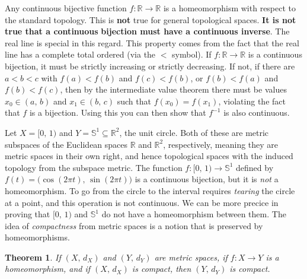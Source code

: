 \documentclass{article}
\theoremstyle{plain}
\newtheorem{theorem}{Theorem}[section]
\theoremstyle{normal}
\newenvironment{example}{%
    \pushQED{\qed}\renewcommand{\qedsymbol}{$\blacksquare$}\examplex%
}{%
    \popQED\endexamplex%
}
\begin{document}
        \begin{example}
            Any continuous bijective function
            $f:\mathbb{R}\rightarrow\mathbb{R}$ is a homeomorphism with respect
            to the standard topology. This is \textbf{not} true for general
            topological spaces. \textbf{It is not true that a continuous}
            \textbf{bijection must have a continuous inverse}. The real line is
            special in this regard. This property comes from the fact that the
            real line has a complete total ordered (via the $<$ symbol). If
            $f:\mathbb{R}\rightarrow\mathbb{R}$ is a continuous bijection, it
            must be strictly increasing or strictly decreasing. If not, if
            there are $a<b<c$ with $f(a)<f(b)$ and $f(c)<f(b)$, or
            $f(b)<f(a)$ and $f(b)<f(c)$, then by the intermediate value theorem
            there must be values $x_{0}\in(a,\,b)$ and $x_{1}\in(b,\,c)$ such
            that $f(x_{0})=f(x_{1})$, violating the fact that $f$ is a
            bijection. Using this you can then show that $f^{-1}$ is also
            continuous.
        \end{example}
        \begin{example}
            Let $X=[0,\,1)$ and $Y=\mathbb{S}^{1}\subseteq\mathbb{R}^{2}$, the
            unit circle. Both of these are metric subspaces of the Euclidean
            spaces $\mathbb{R}$ and $\mathbb{R}^{2}$, respectively, meaning they
            are metric spaces in their own right, and hence topological spaces
            with the induced topology from the subspace metric. The function
            $f:[0,\,1)\rightarrow\mathbb{S}^{1}$ defined by
            $f(t)=\big(\cos(2\pi{t}),\,\sin(2\pi{t})\big)$ is a continuous
            bijection, but it is \textit{not} a homeomorphism. To go from the
            circle to the interval requires \textit{tearing} the circle at a
            point, and this operation is not continuous.
        \end{example}
        We can be more precice in proving that $[0,\,1)$ and $\mathbb{S}^{1}$
        do not have a homeomorphism between them. The idea of
        \textit{compactness} from metric spaces is a notion that is preserved
        by homeomorphisms.
        \begin{theorem}
            If $(X,\,d_{X})$ and $(Y,\,d_{Y})$ are metric spaces, if
            $f:X\rightarrow{Y}$ is a homeomorphism, and if $(X,\,d_{X})$ is
            compact, then $(Y,\,d_{Y})$ is compact.
        \end{theorem}
\end{document}
